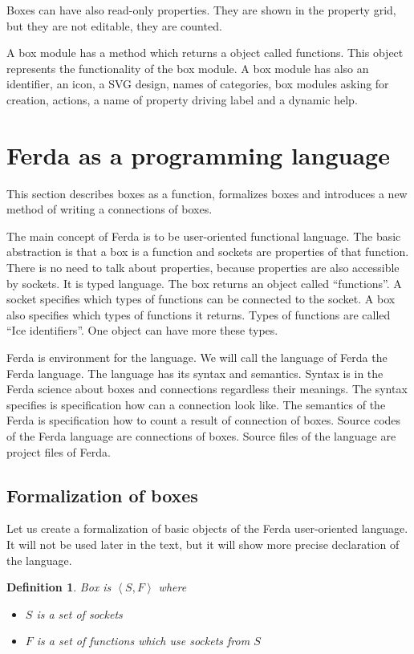 \documentclass[a4paper,12pt]{book}
\begin{document}
Boxes can have also read-only properties. They are shown in the property grid, but they are not editable, they are counted.

A box module has a method which returns a object called functions. This object represents the functionality of the box module. A box module has also an identifier, an icon, a SVG design, names of categories, box modules asking for creation, actions, a name of property driving label and a dynamic help.

\section{Ferda as a programming language}
\newtheorem{mydef}{Definition}

This section describes boxes as a function, formalizes boxes and introduces a new method of writing a connections of boxes.

The main concept of Ferda is to be user-oriented functional language. The basic abstraction is that a box is a function and sockets are properties of that function. There is no need to talk about properties, because properties are also accessible by sockets. It is typed language. The box returns an object called ``functions''. A socket specifies which types of functions can be connected to the socket. A box also specifies which types of functions it returns. Types of functions are called ``Ice identifiers''. One object can have more these types.

Ferda is environment for the language. We will call the language of Ferda the Ferda language. The language has its syntax and semantics. Syntax is in the Ferda science about boxes and connections regardless their meanings. The syntax specifies is specification how can a connection look like. The semantics of the Ferda is specification how to count a result of connection of boxes. Source codes of the Ferda language are connections of boxes. Source files of the language are project files of Ferda.

\subsection{Formalization of boxes}
Let us create a formalization of basic objects of the Ferda user-oriented language. It will not be used later in the text, but it will show more precise declaration of the language.

\begin{mydef}
Box is $\left<S,F\right>$ where
\begin{itemize}
	\item $S$ is a set of sockets
	\item $F$ is a set of functions which use sockets from $S$
\end{itemize}
\end{mydef}
\end{document}
